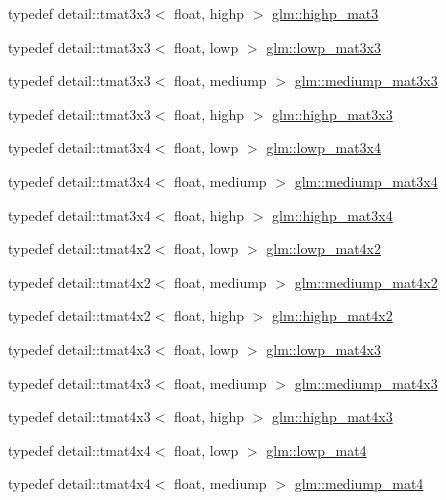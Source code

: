 \begin{CompactItemize}
\item 
typedef detail::tmat3x3$<$ float, highp $>$ \hyperlink{group__core__precision_g334034520a655db41a2e188951f6aaad}{glm::highp\_\-mat3}
\item 
typedef detail::tmat3x3$<$ float, lowp $>$ \hyperlink{group__core__precision_g31688b397d10806ead332c3adb7dc0f0}{glm::lowp\_\-mat3x3}
\item 
typedef detail::tmat3x3$<$ float, mediump $>$ \hyperlink{group__core__precision_ge4c7f0d5d3dab712f9a671183e63e5ab}{glm::mediump\_\-mat3x3}
\item 
typedef detail::tmat3x3$<$ float, highp $>$ \hyperlink{group__core__precision_g8a3703cc71cdfc8928eddf46b3763c4b}{glm::highp\_\-mat3x3}
\item 
typedef detail::tmat3x4$<$ float, lowp $>$ \hyperlink{group__core__precision_g9cea06e7378fe59abf95c1f56edc4320}{glm::lowp\_\-mat3x4}
\item 
typedef detail::tmat3x4$<$ float, mediump $>$ \hyperlink{group__core__precision_g5654236019c6a732844da31534a3cf28}{glm::mediump\_\-mat3x4}
\item 
typedef detail::tmat3x4$<$ float, highp $>$ \hyperlink{group__core__precision_gbaf9c8dd35db715b1093042703f879d0}{glm::highp\_\-mat3x4}
\item 
typedef detail::tmat4x2$<$ float, lowp $>$ \hyperlink{group__core__precision_g2cfe24ae14da17f3510acfc3d03e05a5}{glm::lowp\_\-mat4x2}
\item 
typedef detail::tmat4x2$<$ float, mediump $>$ \hyperlink{group__core__precision_g5ade2a6a65653683f76988c45da39f15}{glm::mediump\_\-mat4x2}
\item 
typedef detail::tmat4x2$<$ float, highp $>$ \hyperlink{group__core__precision_gdf9c4a7947c2b0a79f52cc86a860f270}{glm::highp\_\-mat4x2}
\item 
typedef detail::tmat4x3$<$ float, lowp $>$ \hyperlink{group__core__precision_gda92d0baf15002240dd6f638c57f9fec}{glm::lowp\_\-mat4x3}
\item 
typedef detail::tmat4x3$<$ float, mediump $>$ \hyperlink{group__core__precision_g445d8aac3a5227af2d1e98d5c2f74d03}{glm::mediump\_\-mat4x3}
\item 
typedef detail::tmat4x3$<$ float, highp $>$ \hyperlink{group__core__precision_gb8dfe989c5100c35ab5dec0e94f59d2a}{glm::highp\_\-mat4x3}
\item 
typedef detail::tmat4x4$<$ float, lowp $>$ \hyperlink{group__core__precision_g8f6fef75ce51e9d6db7971478ad1f1c2}{glm::lowp\_\-mat4}
\item 
typedef detail::tmat4x4$<$ float, mediump $>$ \hyperlink{group__core__precision_gf3de9a0400cf707d3c159f32902b92db}{glm::mediump\_\-mat4}

\end{CompactItemize}
